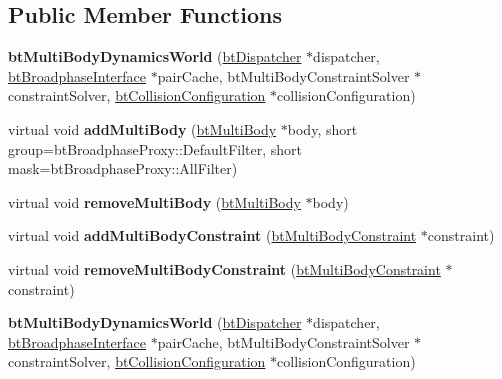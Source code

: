 \subsection*{Public Member Functions}
\begin{DoxyCompactItemize}
\item 
\mbox{\label{classbtMultiBodyDynamicsWorld_ada48332bbd9b86f7bbcbf1454972b136}} 
{\bfseries bt\+Multi\+Body\+Dynamics\+World} (\hyperlink{classbtDispatcher}{bt\+Dispatcher} $\ast$dispatcher, \hyperlink{classbtBroadphaseInterface}{bt\+Broadphase\+Interface} $\ast$pair\+Cache, bt\+Multi\+Body\+Constraint\+Solver $\ast$constraint\+Solver, \hyperlink{classbtCollisionConfiguration}{bt\+Collision\+Configuration} $\ast$collision\+Configuration)
\item 
\mbox{\label{classbtMultiBodyDynamicsWorld_a8ccc168e654b5eae670660a1c89698e6}} 
virtual void {\bfseries add\+Multi\+Body} (\hyperlink{classbtMultiBody}{bt\+Multi\+Body} $\ast$body, short group=bt\+Broadphase\+Proxy\+::\+Default\+Filter, short mask=bt\+Broadphase\+Proxy\+::\+All\+Filter)
\item 
\mbox{\label{classbtMultiBodyDynamicsWorld_ad66a6a1eeef7775c2eb01e76dd739428}} 
virtual void {\bfseries remove\+Multi\+Body} (\hyperlink{classbtMultiBody}{bt\+Multi\+Body} $\ast$body)
\item 
\mbox{\label{classbtMultiBodyDynamicsWorld_a5a066da00459c6376bccfa2eccf05bdd}} 
virtual void {\bfseries add\+Multi\+Body\+Constraint} (\hyperlink{classbtMultiBodyConstraint}{bt\+Multi\+Body\+Constraint} $\ast$constraint)
\item 
\mbox{\label{classbtMultiBodyDynamicsWorld_a65df7891840746799c48b1fab45192c4}} 
virtual void {\bfseries remove\+Multi\+Body\+Constraint} (\hyperlink{classbtMultiBodyConstraint}{bt\+Multi\+Body\+Constraint} $\ast$constraint)
\item 
\mbox{\label{classbtMultiBodyDynamicsWorld_ada48332bbd9b86f7bbcbf1454972b136}} 
{\bfseries bt\+Multi\+Body\+Dynamics\+World} (\hyperlink{classbtDispatcher}{bt\+Dispatcher} $\ast$dispatcher, \hyperlink{classbtBroadphaseInterface}{bt\+Broadphase\+Interface} $\ast$pair\+Cache, bt\+Multi\+Body\+Constraint\+Solver $\ast$constraint\+Solver, \hyperlink{classbtCollisionConfiguration}{bt\+Collision\+Configuration} $\ast$collision\+Configuration)

\end{DoxyCompactItemize}
